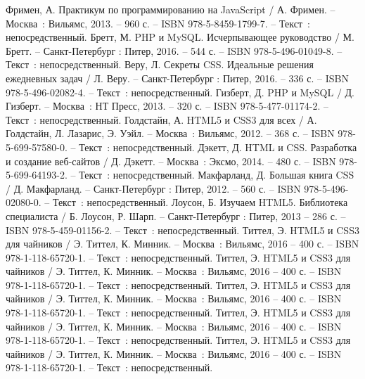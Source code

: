 
\begin{thebibliography}{9}

     Фримен, А. Практикум по программированию на JavaScript / А. Фримен. – Москва~: Вильямс, 2013. – 960 с. – ISBN 978-5-8459-1799-7. – Текст~: непосредственный.
     Бретт, М. PHP и MySQL. Исчерпывающее руководство / М. Бретт. – Санкт-Петербург : Питер, 2016. – 544 с. – ISBN 978-5-496-01049-8. – Текст~: непосредственный.
     Веру, Л. Секреты CSS. Идеальные решения ежедневных задач / Л. Веру. – Санкт-Петербург : Питер, 2016. – 336 с. – ISBN 978-5-496-02082-4. – Текст~: непосредственный.
    	Гизберт, Д. PHP и MySQL / Д. Гизберт. – Москва~: НТ Пресс, 2013. – 320 с. – ISBN 978-5-477-01174-2. – Текст~: непосредственный.
		Голдстайн, А. HTML5 и CSS3 для всех / А. Голдстайн, Л. Лазарис, Э. Уэйл. – Москва~: Вильямс, 2012. – 368 с. – ISBN 978-5-699-57580-0. – Текст~: непосредственный.
		Дэкетт, Д. HTML и CSS. Разработка и создание веб-сайтов / Д. Дэкетт. – Москва~: Эксмо, 2014. – 480 с. – ISBN 978-5-699-64193-2. – Текст~: непосредственный.
		Макфарланд, Д. Большая книга CSS / Д. Макфарланд. – Санкт-Петербург : Питер, 2012. – 560 с. – ISBN 978-5-496-02080-0. – Текст~: непосредственный.
		Лоусон, Б. Изучаем HTML5. Библиотека специалиста / Б. Лоусон, Р. Шарп. – Санкт-Петербург : Питер, 2013 – 286 с. – ISBN 978-5-459-01156-2. – Текст~: непосредственный.
		Титтел, Э. HTML5 и CSS3 для чайников / Э. Титтел, К. Минник. – Москва~: Вильямс, 2016 – 400 с. – ISBN 978-1-118-65720-1. – Текст~: непосредственный.    
		Титтел, Э. HTML5 и CSS3 для чайников / Э. Титтел, К. Минник. – Москва~: Вильямс, 2016 – 400 с. – ISBN 978-1-118-65720-1. – Текст~: непосредственный.    
		Титтел, Э. HTML5 и CSS3 для чайников / Э. Титтел, К. Минник. – Москва~: Вильямс, 2016 – 400 с. – ISBN 978-1-118-65720-1. – Текст~: непосредственный.    
		Титтел, Э. HTML5 и CSS3 для чайников / Э. Титтел, К. Минник. – Москва~: Вильямс, 2016 – 400 с. – ISBN 978-1-118-65720-1. – Текст~: непосредственный.    
		Титтел, Э. HTML5 и CSS3 для чайников / Э. Титтел, К. Минник. – Москва~: Вильямс, 2016 – 400 с. – ISBN 978-1-118-65720-1. – Текст~: непосредственный.
\end{thebibliography}
